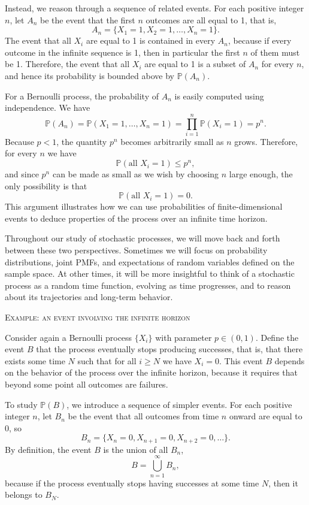 Instead, we reason through a sequence of related events.  
For each positive integer \(n\), let \(A_n\) be the event that the first \(n\) outcomes are all equal to 1, that is,
\[
A_n = \{X_1 = 1, X_2 = 1, \ldots, X_n = 1\}.
\]
The event that all \(X_i\) are equal to 1 is contained in every \(A_n\), because if every outcome in the infinite sequence is 1, then in particular the first \(n\) of them must be 1.  
Therefore, the event that all \(X_i\) are equal to 1 is a subset of \(A_n\) for every \(n\), and hence its probability is bounded above by \(\mathbb{P}(A_n)\).  

For a Bernoulli process, the probability of \(A_n\) is easily computed using independence.  
We have
\[
\mathbb{P}(A_n)
=
\mathbb{P}(X_1 = 1, \ldots, X_n = 1)
=
\prod_{i=1}^{n} \mathbb{P}(X_i = 1)
=
p^n.
\]
Because \(p < 1\), the quantity \(p^n\) becomes arbitrarily small as \(n\) grows.  
Therefore, for every \(n\) we have
\[
\mathbb{P}(\text{all } X_i = 1)
\leq
p^n,
\]
and since \(p^n\) can be made as small as we wish by choosing \(n\) large enough, the only possibility is that
\[
\mathbb{P}(\text{all } X_i = 1) = 0.
\]
This argument illustrates how we can use probabilities of finite-dimensional events to deduce properties of the process over an infinite time horizon.  

Throughout our study of stochastic processes, we will move back and forth between these two perspectives.  
Sometimes we will focus on probability distributions, joint PMFs, and expectations of random variables defined on the sample space.  
At other times, it will be more insightful to think of a stochastic process as a random time function, evolving as time progresses, and to reason about its trajectories and long-term behavior.  

\bigskip
\textsc{Example: an event involving the infinite horizon}

Consider again a Bernoulli process \(\{X_i\}\) with parameter \(p \in (0,1)\).  
Define the event \(B\) that the process eventually stops producing successes, that is, that there exists some time \(N\) such that for all \(i \geq N\) we have \(X_i = 0\).  
This event \(B\) depends on the behavior of the process over the infinite horizon, because it requires that beyond some point all outcomes are failures.  

To study \(\mathbb{P}(B)\), we introduce a sequence of simpler events.  
For each positive integer \(n\), let \(B_n\) be the event that all outcomes from time \(n\) onward are equal to 0, so
\[
B_n = \{X_n = 0, X_{n+1} = 0, X_{n+2} = 0, \ldots\}.
\]
By definition, the event \(B\) is the union of all \(B_n\),
\[
B = \bigcup_{n=1}^{\infty} B_n,
\]
because if the process eventually stops having successes at some time \(N\), then it belongs to \(B_N\).  

